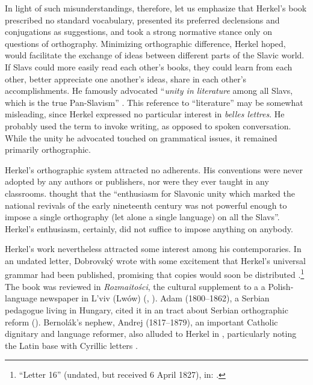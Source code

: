 In light of such misunderstandings, therefore, let us emphasize that Herkel’s book prescribed no standard vocabulary, presented its preferred declensions and conjugations as suggestions, and took a strong normative stance only on questions of orthography. Minimizing orthographic difference, Herkel hoped, would facilitate the exchange of ideas between different parts of the Slavic world. If Slavs could more easily read each other’s books, they could learn from each other, better appreciate one another’s ideas, share in each other’s accomplishments. He famously advocated “\textit{unity in literature} among all Slavs, which is the true Pan-Slavism” \citep[4]{herkel_elementa_1826}. This reference to “literature” may be somewhat misleading, since Herkel expressed no particular interest in \textit{belles lettres}. He probably used the term to invoke writing, as opposed to spoken conversation. While the unity he advocated touched on grammatical issues, it remained primarily orthographic.

Herkel’s orthographic system attracted no adherents. His conventions were never adopted by any authors or publishers, nor were they ever taught in any classrooms. \citet[332]{auty_orthographical_1968} thought that the “enthusiasm for Slavonic unity which marked the national revivals of the early nineteenth century was not powerful enough to impose a single orthography (let alone a single language) on all the Slavs”. Herkel’s enthusiasm, certainly, did not suffice to impose anything on anybody.

Herkel’s work nevertheless attracted some interest among his contemporaries. In an undated letter, Dobrovský wrote with some excitement that Herkel’s universal grammar had been published, promising that copies would soon be distributed \citep[682]{jagic_pisma_1895}.\footnote{“Letter 16” (undated, but received 6 April 1827), in: \citet[682]{jagic_pisma_1895}.} The book was reviewed in \textit{Rozmaitości}, the cultural supplement to a a Polish‐language newspaper in L’viv (Lwów) (, \linebreak{}\cite[180]{anon_z_1827}). Adam \citeauthor{dragosavljevic_postanak_1840} (1800--1862), a Serbian pedagogue living in Hungary, cited it in an \citeyear{dragosavljevic_postanak_1840} tract about Serbian orthographic reform (\citeyear[91]{dragosavljevic_postanak_1840}). Bernolák’s nephew, Andrej \citeauthor{radlinsky_sobranie_1852} (1817--1879), an important Catholic dignitary and language reformer, also alluded to Herkel in \citeyear{radlinsky_sobranie_1852}, particularly noting the Latin base with Cyrillic letters \citep[xiv]{radlinsky_sobranie_1852}.

